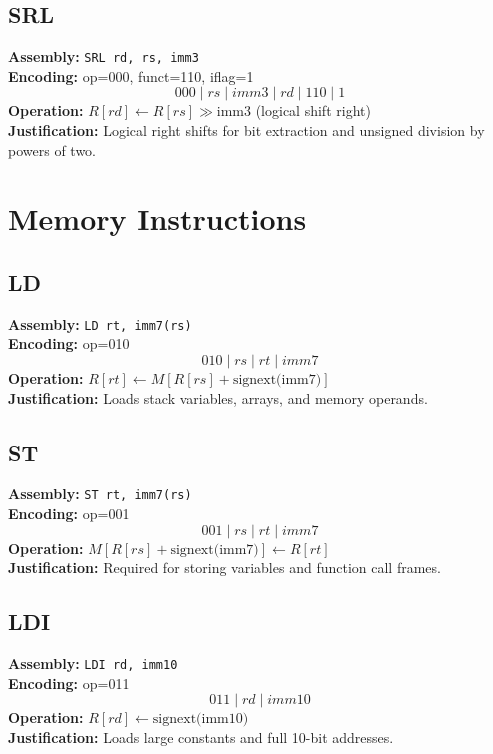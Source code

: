 \documentclass[12pt]{report}
\begin{document}
\vspace{1em}

\subsection*{SRL}
\textbf{Assembly:} \texttt{SRL rd, rs, imm3} \\
\textbf{Encoding:} op=000, funct=110, iflag=1 
\[
000 \;|\; rs \;|\; imm3 \;|\; rd \;|\; 110 \;|\; 1
\]
\textbf{Operation:} \( R[rd] \leftarrow R[rs] \gg \text{imm3} \) (logical shift right) \\
\textbf{Justification:} Logical right shifts for bit extraction and unsigned division by powers of two.

\section{Memory Instructions}

\subsection*{LD}
\textbf{Assembly:} \texttt{LD rt, imm7(rs)} \\
\textbf{Encoding:} op=010 
\[
010 \;|\; rs \;|\; rt \;|\; imm7
\]
\textbf{Operation:} \( R[rt] \leftarrow M[R[rs] + \text{signext(imm7)}] \) \\
\textbf{Justification:} Loads stack variables, arrays, and memory operands.

\vspace{1em}

\subsection*{ST}
\textbf{Assembly:} \texttt{ST rt, imm7(rs)} \\
\textbf{Encoding:} op=001 
\[
001 \;|\; rs \;|\; rt \;|\; imm7
\]
\textbf{Operation:} \( M[R[rs] + \text{signext(imm7)}] \leftarrow R[rt] \) \\
\textbf{Justification:} Required for storing variables and function call frames.

\vspace{1em}

\subsection*{LDI}
\textbf{Assembly:} \texttt{LDI rd, imm10} \\
\textbf{Encoding:} op=011 
\[
011 \;|\; rd \;|\; imm10
\]
\textbf{Operation:} \( R[rd] \leftarrow \text{signext(imm10)} \) \\
\textbf{Justification:} Loads large constants and full 10-bit addresses.
\end{document}
